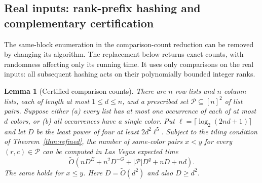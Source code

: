 \documentclass[11pt]{article}
\newtheorem{lemma}[theorem]{Lemma}
\newcommand{\softO}{\widetilde O}
\begin{document}
\subsection*{Real inputs: rank-prefix hashing and complementary certification}
The same-block enumeration in the comparison-count reduction can be
removed by changing its algorithm. The replacement below returns exact
counts, with randomness affecting only its running time. It uses only
comparisons on the real inputs: all subsequent hashing acts on their
polynomially bounded integer ranks.

\begin{lemma}[Certified comparison counts]
\label{lem:prefix-count}
There are $n$ row lists and $n$ column lists, each of length at most
$1\le d\le n$, and a prescribed set $\mathcal P\subseteq[n]^2$ of list
pairs. Suppose either (a) every list has at most one occurrence of each
of at most $d$ colors, or (b) all occurrences have a single color.
Put $\ell=\lceil\log_2(2nd+1)\rceil$ and let $D$ be the least power of four
at least $2d^2\ell^5$. Subject to the tiling condition of
Theorem~\ref{thm:refined}, the number of same-color pairs $x<y$ for every
$(r,c)\in\mathcal P$ can be computed in Las Vegas expected time
\[
\softO\left(nD^E+n^2D^{-G}+|\mathcal P|D^q+nD+nd\right).
\]
The same holds for $x\le y$. Here $D=\softO(d^2)$ and also $D\ge d^2$.
\end{lemma}
\end{document}
